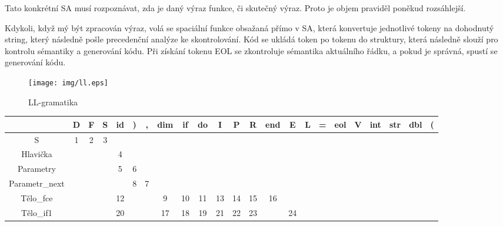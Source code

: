 \documentclass[11pt, a4paper]{article}
\begin{document}
		Tato konkrétní SA musí rozpoznávat, zda je daný výraz funkce, či skutečný výraz. Proto je objem praviděl poněkud rozsáhlejší. 
		
		Kdykoli, když mý být zpracován výraz, volá se spaciální funkce obsažaná přímo v SA, která konvertuje jednotlivé tokeny na dohodnutý string, který následně pošle precedenční analýze ke skontrolování. 
		Kód se ukládá token po tokenu do struktury, která následně slouží pro kontrolu sémantiky a generování kódu. Při získání tokenu EOL se zkontroluje sémantika aktuálního řádku, a pokud je správná, spustí se generování kódu.
		\begin{figure}
			\texttt{[image: img/ll.eps]}
			\caption{LL-gramatika}
			\label{ll}
		\end{figure}
		\begin{table}[h]
			\centering
			{\scriptsize {\renewcommand{\arraystretch}{1.2}
			\addtolength{\tabcolsep}{-1.1pt}
			\begin{tabular}{|c|c|c|c|c|c|c|c|c|c|c|c|c|c|c|c|c|c|c|c|c|c|c|}
				\hline
				& D & F & S & id & )  & ,  & dim & if & do & I & P & R & end & E & L & =  & eol & V & int & str & dbl & (  \\ \hline
				S                   & 1       & 2        & 3     &    &    &    &     &    &    &       &       &        &     &      &      &    &     &         &         &        &        &    \\ \hline
				Hlavička            &         &          &       & 4  &    &    &     &    &    &       &       &        &     &      &      &    &     &         &         &        &        &    \\ \hline
				Parametry           &         &          &       & 5  & 6  &    &     &    &    &       &       &        &     &      &      &    &     &         &         &        &        &    \\ \hline
				Parametr\_next      &         &          &       &    & 8  & 7  &     &    &    &       &       &        &     &      &      &    &     &         &         &        &        &    \\ \hline
				Tělo\_fce           &         &          &       & 12 &    &    & 9   & 10 & 11 & 13    & 14    & 15     & 16  &      &      &    &     &         &         &        &        &    \\ \hline
				Tělo\_if1           &         &          &       & 20 &    &    & 17  & 18 & 19 & 21    & 22    & 23     &     & 24   &      &    &     &         &         &        &        &    \\ \hline

\end{tabular}}}
\end{table}
\end{document}
